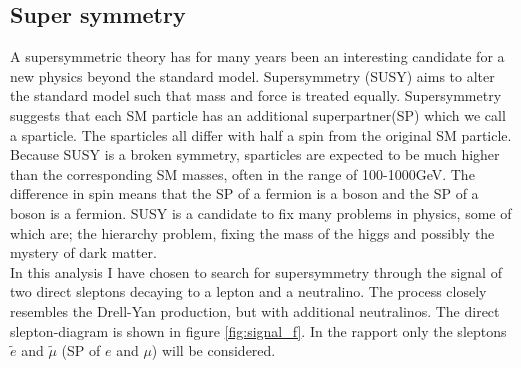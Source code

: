 \documentclass{article}
\begin{document}
\subsection{Super symmetry}\label{sec:SUSY}
A supersymmetric theory has for many years been an interesting candidate for a new physics beyond the standard model. Supersymmetry (SUSY) aims to alter the standard model such that mass and force is treated equally. Supersymmetry suggests that each SM particle has an additional superpartner(SP) which we call a sparticle. The sparticles all differ with half a spin from the original SM particle. Because SUSY is a broken symmetry, sparticles are expected to be much higher than the corresponding SM masses, often in the range of 100-1000GeV. The difference in spin means that the SP of a fermion is a boson and the SP of a boson is a fermion. SUSY is a candidate to fix many problems in physics, some of which are; the hierarchy problem, fixing the mass of the higgs and possibly the mystery of dark matter.
\\
In this analysis I have chosen to search for supersymmetry through the signal of two direct sleptons decaying to a lepton and a neutralino. The process closely resembles the Drell-Yan production, but with additional neutralinos. The direct slepton-diagram is shown in figure \ref{fig:signal_f}. In the rapport only the sleptons $\tilde{e}$ and $\tilde{\mu}$ (SP of ${e}$ and ${\mu}$) will be considered.
\\
\end{document}
